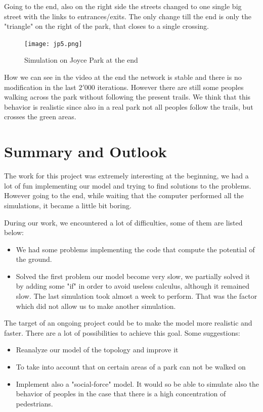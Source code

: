 \documentclass[11pt]{article}
\begin{document}
Going to the end, also on the right side the streets changed to one single big street with the links to entrances/exits. The only change till the end is only the "triangle" on the right of the park, that closes to a single crossing. 

\begin{figure}[H]
        \centering
        \texttt{[image: jp5.png]}
        \caption{Simulation on Joyce Park at the end}
        \label{jp5}
\end{figure}

How we can see in the video at the end the network is stable and there is no modification in the last $2'000$ iterations. However there are still some peoples walking across the park without following the present trails. We think that this behavior is realistic since also in a real park not all peoples follow the trails, but crosses the green areas. 

\newpage

\section{Summary and Outlook}

The work for this project was extremely interesting at the beginning, we had a lot of fun implementing our model and trying to find solutions to the problems. However going to the end, while waiting that the computer performed all the simulations, it became a little bit boring. 
\medskip

During our work, we encountered a lot of difficulties, some of them are listed below:
\begin{itemize}
\item We had some problems implementing the code that compute the potential of the ground. 
\item Solved the first problem our model become very slow, we partially solved it by adding some "if" in order to avoid useless calculus, although it remained slow. The last simulation took almost a week to perform. That was the factor which did not allow us to make another simulation. 
\end{itemize}

\bigskip

The target of an ongoing project could be to make the model more realistic and faster. There are a lot of possibilities to achieve this goal.
Some suggestions:
\begin{itemize}
\item Reanalyze our model of the topology and improve it
\item To take into account that on certain areas of a park can not be walked on
\item Implement also a "social-force" model. It would so be able to simulate also the behavior of peoples in the case that there is a high concentration of pedestrians. 
\end{itemize}
\end{document}
